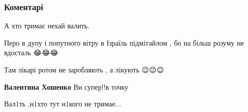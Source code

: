  
 
 
 
 
\subsubsection{Коментарі}

\begin{itemize}
 
А хто тримає нехай валить.

 

Перо в дупу і попутного вітру в Ізраїль підмітайлом , бо на більш розуму не
вдосталь 😂😂😂

Там лікарі ротом не заробляють , а лікують 😉😉😉

\begin{itemize}
 
\textbf{Валентина Хошенко} Ви супер!!в точку
\end{itemize}

 
Вал1ть ,н1хто тут н1кого не тримае...

 

\end{itemize}
